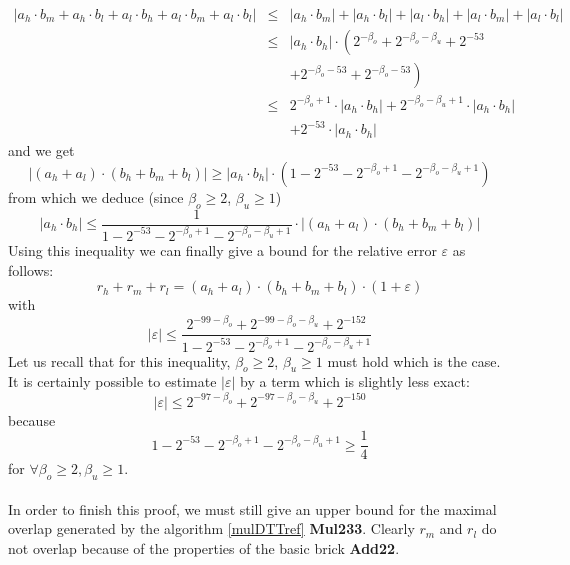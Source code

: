 \documentclass[a4paper,10pt,twoside]{article}
\newenvironment{proof}[1][Proof]{\begin{trivlist}
\item[\hskip \labelsep {\bfseries #1}]}{\end{trivlist}}
\newcommand{\hi}{\ensuremath{\mathit{h}}}
\newcommand{\mi}{\ensuremath{\mathit{m}}}
\newcommand{\lo}{\ensuremath{\mathit{l}}}
\newcommand{\AddDD}{{\bf Add22}}
\newcommand{\MulDTT}{{\bf Mul233}}
\renewcommand{\epsilon}{\varepsilon}
\begin{document}
\begin{proof}
\begin{eqnarray*}
\left \vert a_\hi \cdot b_\mi + a_\hi \cdot b_\lo + a_\lo \cdot b_\hi + a_\lo \cdot b_\mi + a_\lo \cdot b_\lo \right \vert & \leq &
\left \vert a_\hi \cdot b_\mi \right \vert +
\left \vert a_\hi \cdot b_\lo \right \vert +
\left \vert a_\lo \cdot b_\hi \right \vert +
\left \vert a_\lo \cdot b_\mi \right \vert +
\left \vert a_\lo \cdot b_\lo \right \vert \\
& \leq & \left \vert a_\hi \cdot b_\hi \right \vert \cdot \left( 2^{-\beta_o}  +
2^{-\beta_o-\beta_u} +
2^{-53}  \right. \\ & & \left.  +
2^{-\beta_o-53} +
2^{-\beta_o-53} \right) \\
& \leq & 2^{-\beta_o+1} \cdot \left \vert a_\hi \cdot b_\hi \right \vert +
2^{-\beta_o-\beta_u+1} \cdot \left \vert a_\hi \cdot b_\hi \right \vert  \\ & & +
2^{-53} \cdot \left \vert a_\hi \cdot b_\hi \right \vert
\end{eqnarray*}
and we get
$$\left \vert \left( a_\hi + a_\lo \right) \cdot \left( b_\hi + b_\mi + b_\lo \right) \right \vert \geq
\left \vert a_\hi \cdot b_\hi \right \vert \cdot \left( 1 - 2^{-53} - 2^{-\beta_o+1} -2^{-\beta_o-\beta_u+1} \right)$$
from which we deduce (since $\beta_o \geq 2$, $\beta_u \geq 1$)
$$\left \vert a_\hi \cdot b_\hi \right \vert \leq \frac{1}{1 - 2^{-53} - 2^{-\beta_o+1} -2^{-\beta_o-\beta_u+1}} \cdot
\left \vert \left( a_\hi + a_\lo \right) \cdot \left( b_\hi + b_\mi + b_\lo \right) \right \vert$$
Using this inequality we can finally give a bound for the relative error $\epsilon$ as follows:
$$r_\hi + r_\mi + r_\lo = \left( a_\hi + a_\lo \right) \cdot \left( b_\hi + b_\mi + b_\lo \right) \cdot \left( 1 + \epsilon \right)$$
with
$$\left \vert \epsilon \right \vert \leq
\frac{2^{-99-\beta_o} + 2^{-99-\beta_o-\beta_u} + 2^{-152}}{1 - 2^{-53} - 2^{-\beta_o+1} -2^{-\beta_o-\beta_u+1}}$$
Let us recall that for this inequality, $\beta_o \geq 2$, $\beta_u \geq 1$ must hold which is the case.\\
It is certainly possible to estimate $\left \vert \epsilon \right \vert$ by a term which is slightly less exact:
$$\left \vert \epsilon \right \vert \leq 2^{-97 - \beta_o} + 2^{-97 - \beta_o - \beta_u} + 2^{-150}$$
because
$$1 - 2^{-53} - 2^{-\beta_o+1} -2^{-\beta_o-\beta_u+1} \geq \frac{1}{4}$$
for $\forall \beta_o \geq 2, \beta_u \geq 1$.\\~\\
In order to finish this proof, we must still give an upper bound for the maximal overlap generated by the
algorithm \ref{mulDTTref} \MulDTT.
Clearly $r_\mi$ and $r_\lo$ do not overlap because of the properties of the basic brick \AddDD.

\end{proof}
\end{document}
